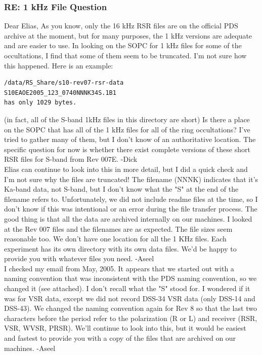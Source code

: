 \documentclass[crop=false,class=book]{standalone}
\begin{document}
\subsubsection{\footnotesize RE: 1 kHz File Question}
Dear Elias, As you know, only the 16 kHz RSR files are on the official PDS archive at the moment, but for many purposes, the 1 kHz versions are adequate and are easier to use. In looking on the SOPC for 1 kHz files for some of the occultations, I find that some of them seem to be truncated. I'm not sure how this happened. Here is an example:
\begin{lstlisting}[language=bash]
/data/RS_Share/s10-rev07-rsr-data
S10EAOE2005_123_0740NNNK34S.1B1
has only 1029 bytes.
\end{lstlisting}
(in fact, all of the S-band 1kHz files in this directory are short)
Is there a place on the SOPC that has all of the 1 kHz files for all of the ring occultations? I've tried to gather many of them, but I don't know of an authoritative location. The specific question for now is whether there exist complete versions of these short RSR files for S-band from Rev 007E. -Dick\\
Elias can continue to look into this in more detail, but I did a quick check and I'm not sure why the files are truncated! The filename (NNNK) indicates that it's Ka-band data, not S-band, but I don't know what the "S" at the end of the filename refers to.  Unfortunately, we did not include readme files at the time, so I don't know if this was intentional or an error during the file transfer process. The good thing is that all the data are archived internally on our machines.  I looked at the Rev 007 files and the filenames are as expected.  The file sizes seem reasonable too. We don't have one location for all the 1 KHz files.  Each experiment has its own directory with its own data files.  We'd be happy to provide you with whatever files you need. -Aseel\\
I checked my email from May, 2005.  It appears that we started out with a naming convention that was inconsistent with the PDS naming convention, so we changed it (see attached).  I don't recall what the "S" stood for.  I wondered if it was for VSR data, except we did not record DSS-34 VSR data (only DSS-14 and DSS-43). We changed the naming convention again for Rev 8 so that the last two characters before the period refer to the polarization (R or L) and receiver (RSR, VSR, WVSR, PRSR). We'll continue to look into this, but it would be easiest and fastest to provide you with a copy of the files that are archived on our machines. -Aseel
\end{document}
